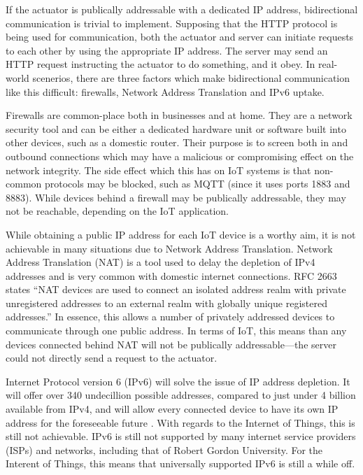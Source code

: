       If the actuator is publically addressable with a dedicated IP address, bidirectional communication is trivial to implement. Supposing that the HTTP protocol is being used for communication, both the actuator and server can initiate requests to each other by using the appropriate IP address. The server may send an HTTP request instructing the actuator to do something, and it obey. In real-world scenerios, there are three factors which make bidirectional communication like this difficult: firewalls, Network Address Translation and IPv6 uptake.

      Firewalls are common-place both in businesses and at home. They are a network security tool and can be either a dedicated hardware unit or software built into other devices, such as a domestic router. Their purpose is to screen both in and outbound connections which may have a malicious or compromising effect on the network integrity. The side effect which this has on IoT systems is that non-common protocols may be blocked, such as MQTT (since it uses ports 1883 and 8883). While devices behind a firewall may be publically addressable, they may not be reachable, depending on the IoT application.

      While obtaining a public IP address for each IoT device is a worthy aim, it is not achievable in many situations due to Network Address Translation. Network Address Translation (NAT) is a tool used to delay the depletion of IPv4 addresses and is very common with domestic internet connections. RFC 2663 \citep{rfc2663} states ``NAT devices are used to connect an isolated address realm with private unregistered addresses to an external realm with globally unique registered addresses.'' In essence, this allows a number of privately addressed devices to communicate through one public address. In terms of IoT, this means than any devices connected behind NAT will not be publically addressable---the server could not directly send a request to the actuator.

      Internet Protocol version 6 (IPv6) will solve the issue of IP address depletion. It will offer over 340 undecillion possible addresses, compared to just under 4 billion available from IPv4, and will allow every connected device to have its own IP address for the foreseeable future \citep{ipv6:2008}. With regards to the Internet of Things, this is still not achievable. IPv6 is still not supported by many internet service providers (ISPs) and networks, including that of Robert Gordon University. For the Interent of Things, this means that universally supported IPv6 is still a while off.

